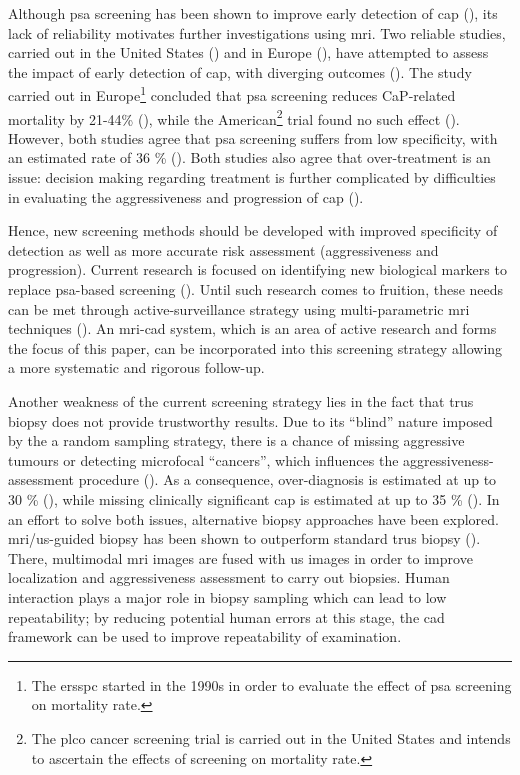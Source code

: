 Although \ac{psa} screening has been shown to improve early detection of \ac{cap} (\cite{Chou2011}), its lack of reliability motivates further investigations using \ac{mri}. Two reliable studies, carried out in the United States (\cite{Andriole2009}) and in Europe (\cite{Schroeder2012, Hugosson2010}), have attempted to assess the impact of early detection of \ac{cap}, with diverging outcomes (\cite{Chou2011,Heidenreich2013}). The study carried out in Europe\footnote{The \ac{ersspc}  started in the 1990s in order to evaluate the effect of \ac{psa} screening on mortality rate.} concluded that \ac{psa} screening reduces CaP-related mortality by 21-44\% (\cite{Schroeder2012, Hugosson2010}), while the American\footnote{The \ac{plco} cancer screening trial is carried out in the United States and intends to ascertain the effects of screening on mortality rate.} trial found no such effect (\cite{Andriole2009}). However, both studies agree that \ac{psa} screening suffers from low specificity, with an estimated rate of 36 \% (\cite{Schroder2008}). Both studies also agree that over-treatment is an issue: decision making regarding treatment is further complicated by difficulties in evaluating the aggressiveness and progression of \ac{cap} (\cite{Delpierre2013}). 

Hence, new screening methods should be developed with improved specificity of detection as well as more accurate risk assessment (aggressiveness and progression). Current research is focused on identifying new biological markers to replace \ac{psa}-based screening (\cite{Bourdoumis2010,Morgan2011,Brenner2013}). Until such research comes to fruition, these needs can be met through active-surveillance strategy using multi-parametric \ac{mri} techniques (\cite{Hoeks2011,Moore2013}). An \ac{mri}-\acs{cad} system, which is an area of active research and forms the focus of this paper, can be incorporated into this screening strategy allowing a more systematic and rigorous follow-up.

Another weakness of the current screening strategy lies in the fact that \ac{trus} biopsy does not provide trustworthy results. Due to its ``blind'' nature imposed by the a random sampling strategy, there is a chance of missing aggressive tumours or detecting microfocal ``cancers'', which influences the aggressiveness-assessment procedure (\cite{Noguchi2001}). As a consequence, over-diagnosis is estimated at up to 30 \% (\cite{Haas2007}), while missing clinically significant \ac{cap} is estimated at up to 35 \% (\cite{Taira2010}). In an effort to solve both issues, alternative biopsy approaches have been explored. \ac{mri}/\ac{us}-guided biopsy has been shown to outperform standard \ac{trus} biopsy (\cite{Delongchamps2013}). There, multimodal \ac{mri} images are fused with \ac{us} images in order to improve localization and aggressiveness assessment to carry out biopsies. Human interaction plays a major role in biopsy sampling which can lead to low repeatability; by reducing potential human errors at this stage, the \acs{cad} framework can be used to improve repeatability of examination.

